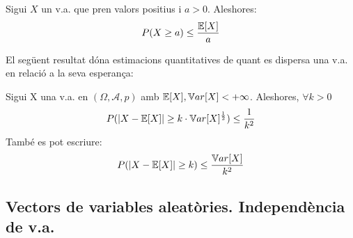 \begin{thm}
  Sigui $X$ un v.a. que pren valors positius i $a > 0$. Aleshores: \\
  \[
    P(X \geq a) \leq \frac{\mathbb{E}[X]}{a}
  \]
\end{thm}

El següent resultat dóna estimacions quantitatives de quant es dispersa una v.a. en relació a la seva esperança:

\begin{thm}
  Sigui X una v.a. en $(\Omega, \mathcal{A}, p)$ amb $\mathbb{E}[X], \mathbb{V} ar[X] < +\infty$. Aleshores, $\forall k > 0$
  \[
    P(\left\vert X-\mathbb{E}[X] \right\vert\geq k\cdot \mathbb{V} ar[X]^{\frac{1}{2}}) \leq \frac{1}{k^{2}}
  \]
  També es pot escriure:
  \[
    P(\left\vert X-\mathbb{E}[X] \right\vert\geq k) \leq \frac{\mathbb{V} ar[X]}{k^{2}}
  \]
\end{thm}

\newpage
\subsection{Vectors de variables aleatòries. Independència de v.a.}
